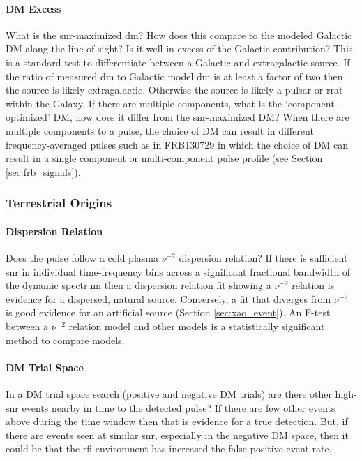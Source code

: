 \documentclass[a4paper,fleqn,usenatbib]{mnras}
\begin{document}
\paragraph{DM Excess}

What is the \gls{snr}-maximized \gls{dm}? How does this compare to the modeled
Galactic DM along the line of sight? Is it well in excess of the Galactic
contribution? This is a standard test to differentiate between a Galactic and
extragalactic source. If the ratio of measured \gls{dm} to Galactic model
\gls{dm} is at least a factor of two then the source is likely extragalactic.
Otherwise the source is likely a pulsar or \gls{rrat} within the Galaxy.  If
there are multiple components, what is the `component-optimized' DM, how does it
differ from the \gls{snr}-maximized DM? When there are multiple components to a
pulse, the choice of DM can result in different frequency-averaged pulses such
as in FRB130729 in which the choice of DM can result in a single component or
multi-component pulse profile (see Section \ref{sec:frb_signals}).

\subsubsection{Terrestrial Origins}

\paragraph{Dispersion Relation}

Does the pulse follow a cold plasma $\nu^{-2}$ dispersion relation? If there is
sufficient \gls{snr} in individual time-frequency bins across a significant
fractional bandwidth of the dynamic spectrum then a dispersion relation fit
showing a $\nu^{-2}$ relation is evidence for a dispersed, natural source.
Conversely, a fit that diverges from $\nu^{-2}$ is good evidence for an
artificial source (Section \ref{sec:xao_event}). An F-test between a $\nu^{-2}$
relation model and other models is a statistically significant method to compare
models.

\paragraph{DM Trial Space}

In a DM trial space search (positive and negative DM trials) are there other
high-\gls{snr} events nearby in time to the detected pulse? If there are few
other events above during the time window then that is evidence for a true
detection. But, if there are events seen at similar \gls{snr}, especially in the
negative DM space, then it could be that the \gls{rfi} environment has
increased the false-positive event rate.
\end{document}
